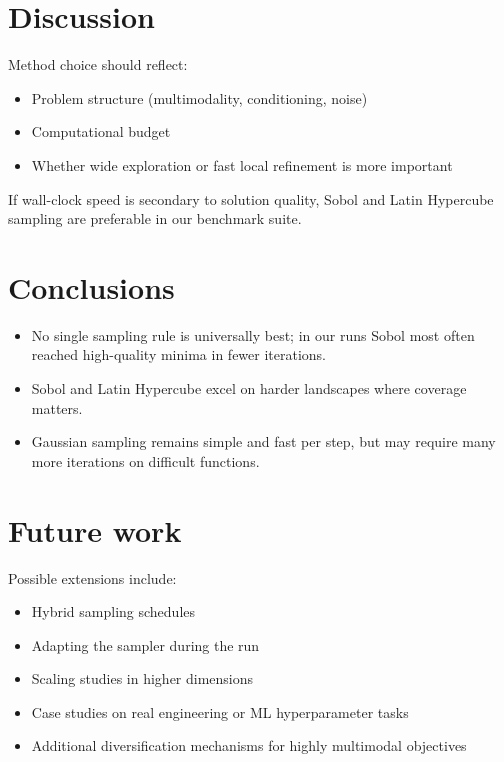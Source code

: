 \documentclass[12pt,a4paper]{article}
\begin{document}
\section{Discussion}
Method choice should reflect:
\begin{itemize}
    \item Problem structure (multimodality, conditioning, noise)
    \item Computational budget
    \item Whether wide exploration or fast local refinement is more important
\end{itemize}

If wall-clock speed is secondary to solution quality, Sobol and Latin Hypercube sampling are preferable in our benchmark suite.

\section{Conclusions}
\begin{itemize}
    \item No single sampling rule is universally best; in our runs Sobol most often reached high-quality minima in fewer iterations.
    \item Sobol and Latin Hypercube excel on harder landscapes where coverage matters.
    \item Gaussian sampling remains simple and fast per step, but may require many more iterations on difficult functions.
\end{itemize}

\section{Future work}
Possible extensions include:
\begin{itemize}
    \item Hybrid sampling schedules
    \item Adapting the sampler during the run
    \item Scaling studies in higher dimensions
    \item Case studies on real engineering or ML hyperparameter tasks
    \item Additional diversification mechanisms for highly multimodal objectives
\end{itemize}
\end{document}
